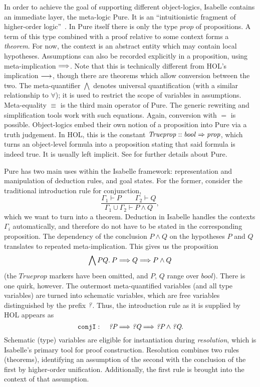 In order to achieve the goal of supporting different object-logics,
Isabelle contains an immediate layer, the meta-logic Pure.
It is an ``intuitionistic fragment of higher-order logic''~\cite[27]{isar-ref}.
In Pure itself there is only the type $\mathit{prop}$ of propositions.
A term of this type combined with a proof relative to some context forms a
\emph{theorem}.
For now, the context is an abstract entity which may contain local hypotheses.
Assumptions can also be recorded explicitly in a proposition, using
meta-implication $\Longrightarrow$.
Note that this is technically different from HOL's implication $\longrightarrow$,
though there are theorems which allow conversion between the two.
The meta-quantifier $\bigwedge$ denotes universal quantification (with a
similar relationship to $\forall$); it is used to restrict the scope of
variables in assumptions.
Meta-equality $\equiv$ is the third main operator of Pure.
The generic rewriting and simplification tools work with such equations.
Again, conversion with $=$ is possible.
Object-logics embed their own notion of a proposition into Pure via
a truth judgement.
In HOL, this is the constant $\mathit{Trueprop} \mathrel{::} \mathit{bool \Rightarrow prop}$,
which turns an object-level formula into a proposition stating that said
formula is indeed true.
It is usually left implicit.
See \cite[Chapter~2]{implementation-ref} for further details about Pure.

Pure has two main uses within the Isabelle framework: representation and
manipulation of deduction rules, and goal states.
For the former, consider the traditional introduction rule for conjunction,
\[ \frac{\Gamma_1 \vdash P \qquad \Gamma_2 \vdash Q}{\Gamma_1 \cup \Gamma_2 \vdash P \land Q}, \]
which we want to turn into a theorem.
Deduction in Isabelle handles the contexts $\Gamma_i$ automatically, and
therefore do not have to be stated in the corresponding proposition.
The dependency of the conclusion $P \land Q$ on the hypotheses $P$ and $Q$
translates to repeated meta-implication.
This gives us the proposition
\[ \bigwedge P Q.\>P \Longrightarrow Q \Longrightarrow P \land Q \]
(the $\mathit{Trueprop}$ markers have been omitted, and $P$, $Q$ range over
$\mathit{bool}$).
There is one quirk, however.
The outermost meta-quantified variables (and all type variables) %
are turned into schematic variables, which are free variables distinguished by
the prefix $\textit{?}$.
Thus, the introduction rule as it is supplied by HOL appears as
\[ \mathtt{conjI}:\quad \textit{?P} \Longrightarrow \textit{?Q} \Longrightarrow \textit{?P} \land \textit{?Q}. \]
Schematic (type) variables are eligible for instantiation during
\emph{resolution}, which is Isabelle's primary tool for proof construction.
Resolution combines two rules (theorems), identifying an assumption of the
second with the conclusion of the first by higher-order unification.
Additionally, the first rule is brought into the context of that assumption.

